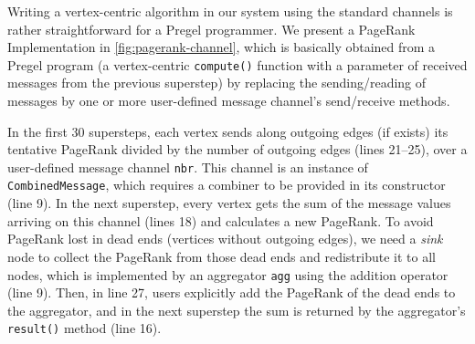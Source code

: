 \documentclass{sokendai_thesis} %
\begin{document}
Writing a vertex-centric algorithm in our system using the standard channels is rather straightforward for a Pregel programmer.
We present a PageRank Implementation in \autoref{fig:pagerank-channel}, which is basically obtained from a Pregel program (a vertex-centric \texttt{compute()} function with a parameter of received messages from the previous superstep) by replacing the sending/reading of messages by one or more user-defined message channel's send/receive methods.

In the first 30 supersteps, each vertex sends along outgoing edges (if exists) its tentative PageRank divided by the number of outgoing edges (lines 21--25), over a user-defined message channel \texttt{nbr}.
This channel is an instance of \texttt{CombinedMessage}, which requires a combiner to be provided in its constructor (line 9).
In the next superstep, every vertex gets the sum of the message values arriving on this channel (lines 18) and calculates a new PageRank.
To avoid PageRank lost in dead ends (vertices without outgoing edges), we need a \textit{sink} node to collect the PageRank from those dead ends and redistribute it to all nodes, which is implemented by an aggregator \texttt{agg} using the addition operator (line 9).
Then, in line 27, users explicitly add the PageRank of the dead ends to the aggregator, and in the next superstep the sum is returned by the aggregator's \texttt{result()} method (line 16).

\end{document}
